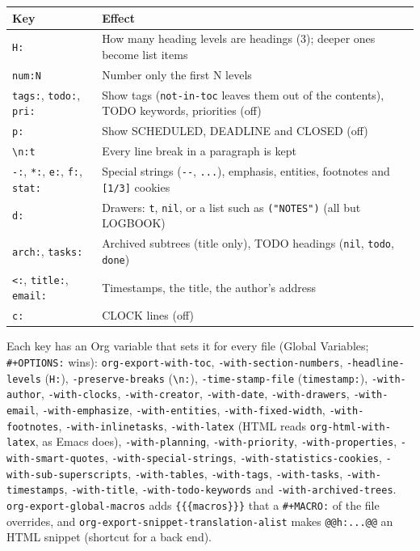 \documentclass[11pt]{article}
\begin{document}
\begin{center}
\begin{tabular}{ll}
Key & Effect\\[0pt]
\hline
\texttt{H:} & How many heading levels are headings (3); deeper ones become list items\\[0pt]
\texttt{num:N} & Number only the first N levels\\[0pt]
\texttt{tags:}, \texttt{todo:}, \texttt{pri:} & Show tags (\texttt{not-in-toc} leaves them out of the contents), TODO keywords, priorities (off)\\[0pt]
\texttt{p:} & Show SCHEDULED, DEADLINE and CLOSED (off)\\[0pt]
\texttt{\textbackslash{}n:t} & Every line break in a paragraph is kept\\[0pt]
\texttt{-:}, \texttt{*:}, \texttt{e:}, \texttt{f:}, \texttt{stat:} & Special strings (\texttt{-{}-{}}, \texttt{...}), emphasis, entities, footnotes and \texttt{[1/3]} cookies\\[0pt]
\texttt{d:} & Drawers: \texttt{t}, \texttt{nil}, or a list such as \texttt{("NOTES")} (all but LOGBOOK)\\[0pt]
\texttt{arch:}, \texttt{tasks:} & Archived subtrees (title only), TODO headings (\texttt{nil}, \texttt{todo}, \texttt{done})\\[0pt]
\texttt{<:}, \texttt{title:}, \texttt{email:} & Timestamps, the title, the author's address\\[0pt]
\texttt{c:} & CLOCK lines (off)\\[0pt]
\end{tabular}
\end{center}

Each key has an Org variable that sets it for every file (Global Variables; \texttt{\#+OPTIONS:} wins): \texttt{org-export-with-toc}, \texttt{-with-section-numbers}, \texttt{-headline-levels} (\texttt{H:}), \texttt{-preserve-breaks} (\texttt{\textbackslash{}n:}), \texttt{-time-stamp-file} (\texttt{timestamp:}), \texttt{-with-author}, \texttt{-with-clocks}, \texttt{-with-creator}, \texttt{-with-date}, \texttt{-with-drawers}, \texttt{-with-email}, \texttt{-with-emphasize}, \texttt{-with-entities}, \texttt{-with-fixed-width}, \texttt{-with-footnotes}, \texttt{-with-inlinetasks}, \texttt{-with-latex} (HTML reads \texttt{org-html-with-latex}, as Emacs does), \texttt{-with-planning}, \texttt{-with-priority}, \texttt{-with-properties}, \texttt{-with-smart-quotes}, \texttt{-with-special-strings}, \texttt{-with-statistics-cookies}, \texttt{-with-sub-superscripts}, \texttt{-with-tables}, \texttt{-with-tags}, \texttt{-with-tasks}, \texttt{-with-timestamps}, \texttt{-with-title}, \texttt{-with-todo-keywords} and \texttt{-with-archived-trees}. \texttt{org-export-global-macros} adds \texttt{\{\{\{macros\}\}\}} that a \texttt{\#+MACRO:} of the file overrides, and \texttt{org-export-snippet-translation-alist} makes \texttt{@@h:...@@} an HTML snippet (shortcut for a back end).
\end{document}
